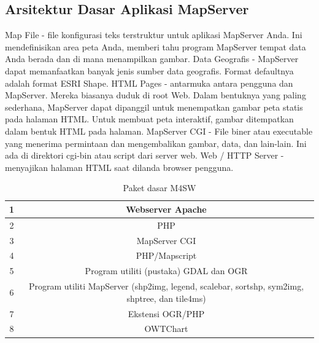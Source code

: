 \subsection{Arsitektur Dasar Aplikasi MapServer}
Map File - file konfigurasi teks terstruktur untuk aplikasi MapServer Anda. Ini mendefinisikan area peta Anda, memberi tahu program MapServer tempat data Anda berada dan di mana menampilkan gambar.
Data Geografis - MapServer dapat memanfaatkan banyak jenis sumber data geografis. Format defaultnya adalah format ESRI Shape.
HTML Pages - antarmuka antara pengguna dan MapServer. Mereka biasanya duduk di root Web. Dalam bentuknya yang paling sederhana, MapServer dapat dipanggil untuk menempatkan gambar peta statis pada halaman HTML. Untuk membuat peta interaktif, gambar ditempatkan dalam bentuk HTML pada halaman.
MapServer CGI - File biner atau executable yang menerima permintaan dan mengembalikan gambar, data, dan lain-lain. Ini ada di direktori cgi-bin atau script dari server web.
Web / HTTP Server - menyajikan halaman HTML saat dilanda browser pengguna.

\begin{table}[h]
\caption{Paket dasar M4SW}
\centering
\begin{tabular}{cc}
\hline
1&Webserver Apache\\
\hline
2&PHP\\
\hline
3&MapServer CGI\\
\hline
4&PHP/Mapscript\\
\hline
5&Program utiliti (pustaka) GDAL dan OGR\\
\hline
6&Program utiliti MapServer (shp2img, legend, scalebar, sortshp, sym2img, shptree, dan tile4ms)\\
\hline
7&Ekstensi OGR/PHP\\
\hline
8&OWTChart\\
\hline
\end{tabular}
\end{table}

